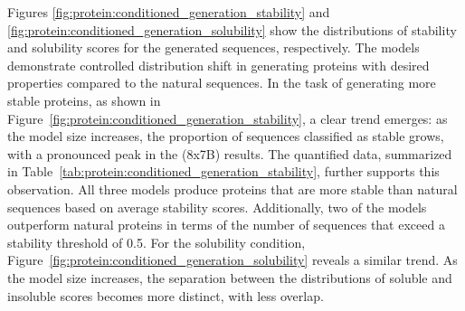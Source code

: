 
Figures \ref{fig:protein:conditioned_generation_stability} and \ref{fig:protein:conditioned_generation_solubility} show the distributions of stability and solubility scores for the generated sequences, respectively. The \ourM{} models demonstrate controlled distribution shift in generating proteins with desired properties compared to the natural sequences. 
%
In the task of generating more stable proteins, as shown in Figure~\ref{fig:protein:conditioned_generation_stability}, a clear trend emerges: as the model size increases, the proportion of sequences classified as stable grows, with a pronounced peak in the \ourM{} (8x7B) results. The quantified data, summarized in Table~\ref{tab:protein:conditioned_generation_stability}, further supports this observation. All three models produce proteins that are more stable than natural sequences based on average stability scores. Additionally, two of the models outperform natural proteins in terms of the number of sequences that exceed a stability threshold of 0.5.
%
For the solubility condition, Figure~\ref{fig:protein:conditioned_generation_solubility} reveals a similar trend. As the model size increases, the separation between the distributions of soluble and insoluble scores becomes more distinct, with less overlap. 

